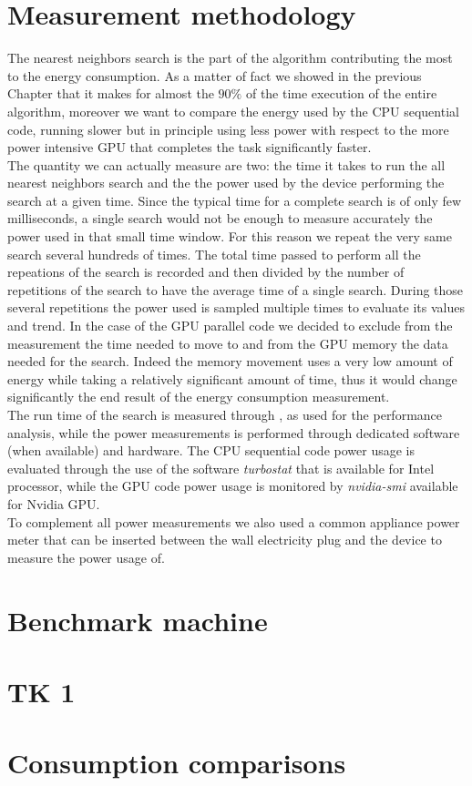 \section{Measurement methodology}
The nearest neighbors search is the part of the algorithm contributing the most to the energy consumption. As a matter of fact we showed in the previous Chapter that it makes for almost the $90\%$ of the time execution of the entire algorithm, moreover we want to compare the energy used by the CPU sequential code, running slower but in principle using less power with respect to the more power intensive GPU that completes the task significantly faster.\\ 
The quantity we can actually measure are two: the time it takes to run the all nearest neighbors search and the the power used by the device performing the search at a given time.
Since the typical time for a complete search is of only few milliseconds, a single search would not be enough to measure accurately the power used in that small time window. For this reason we repeat the very same search several hundreds of times. The total time passed to perform all the repeations of the search is recorded and then divided by the number of repetitions of the search to have the average time of a single search. During those several repetitions the power used is sampled multiple times to evaluate its values and trend. In the case of the GPU parallel code we decided to exclude from the measurement the time needed to move to and from the GPU memory the data needed for the search. Indeed the memory movement uses a very low amount of energy while taking a relatively significant amount of time, thus it would change significantly the end result of the energy consumption measurement.\\
The run time of the search is measured through , as used for the performance analysis, while the power measurements is performed through dedicated software (when available) and hardware. The CPU sequential code power usage is evaluated through the use of the software \textit{turbostat} that is available for Intel processor, while the GPU code power usage is monitored by \textit{nvidia-smi} available for Nvidia GPU.\\
To complement all power measurements we also used a common appliance power meter that can be inserted between the wall electricity plug and the device to measure the power usage of.

\section{Benchmark machine}

\section{TK 1}

\section{Consumption comparisons}